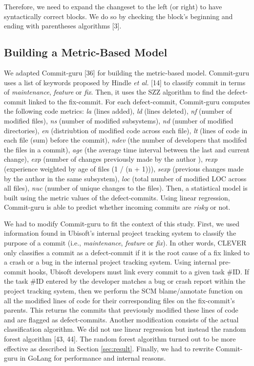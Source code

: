 \documentclass[sigconf]{acmart}
\begin{document}
Therefore, we need to expand the changeset to the left (or right) to
have syntactically correct blocks. We do so by checking the block's
beginning and ending with parentheses algorithms [3].

\subsection{Building a Metric-Based Model}\label{sec:metric-based}

We adapted Commit-guru [36] for building the metric-based model.
Commit-guru uses a list of keywords proposed by Hindle \emph{et al.}
[14] to classify commit in terms of \emph{maintenance},
\emph{feature} or \emph{fix}. Then, it uses the SZZ algorithm to find
the defect-commit linked to the fix-commit. For each defect-commit,
Commit-guru computes the following code metrics: \emph{la} (lines
added), \emph{ld} (lines deleted), \emph{nf} (number of modified files),
\emph{ns} (number of modified subsystems), \emph{nd} (number of modified
directories), \emph{en} (distriubtion of modified code across each
file), \emph{lt} (lines of code in each file (sum) before the commit),
\emph{ndev} (the number of developers that modifed the files in a
commit), \emph{age} (the average time interval between the last and
current change), \emph{exp} (number of changes previously made by the
author ), \emph{rexp} (experience weighted by age of files (1 / (n +
1))), \emph{sexp} (previous changes made by the author in the same
subsystem), \emph{loc} (total number of modified LOC across all files),
\emph{nuc} (number of unique changes to the files). Then, a statistical
model is built using the metric values of the defect-commits. Using
linear regression, Commit-guru is able to predict whether incoming
commits are \emph{risky} or not.

We had to modify Commit-guru to fit the context of this study. First, we
used information found in Ubisoft's internal project tracking system to
classify the purpose of a commit (i.e., \emph{maintenance},
\emph{feature} or \emph{fix}). In other words, CLEVER only classifies a
commit as a defect-commit if it is the root cause of a fix linked to a
crash or a bug in the internal project tracking system. Using internal
pre-commit hooks, Ubisoft developers must link every commit to a given
task \#ID. If the task \#ID entered by the developer matches a bug or
crash report within the project tracking system, then we perform the SCM
blame/annotate function on all the modified lines of code for their
corresponding files on the fix-commit's parents. This returns the
commits that previously modified these lines of code and are flagged as
defect-commits. Another modification consists of the actual
classification algorithm. We did not use linear regression but instead
the random forest algorithm [43, 44]. The random forest algorithm
turned out to be more effective as described in Section
\ref{sec:result}. Finally, we had to rewrite Commit-guru in GoLang for
performance and internal reasons.
\end{document}
